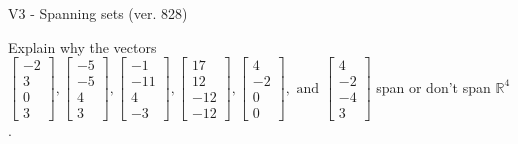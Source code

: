 \begin{exercise}
  \begin{exerciseTitle}V3 - Spanning sets (ver. 828)\end{exerciseTitle}
  \begin{exerciseStatement}
    Explain why the vectors \(\left[\begin{array}{r}
-2 \\
3 \\
0 \\
3
\end{array}\right] , \left[\begin{array}{r}
-5 \\
-5 \\
4 \\
3
\end{array}\right] , \left[\begin{array}{r}
-1 \\
-11 \\
4 \\
-3
\end{array}\right] , \left[\begin{array}{r}
17 \\
12 \\
-12 \\
-12
\end{array}\right] , \left[\begin{array}{r}
4 \\
-2 \\
0 \\
0
\end{array}\right] , \text{ and } \left[\begin{array}{r}
4 \\
-2 \\
-4 \\
3
\end{array}\right]\) span or don't span \(\mathbb{R}^4\). 
	



\end{exerciseStatement}
\end{exercise}

